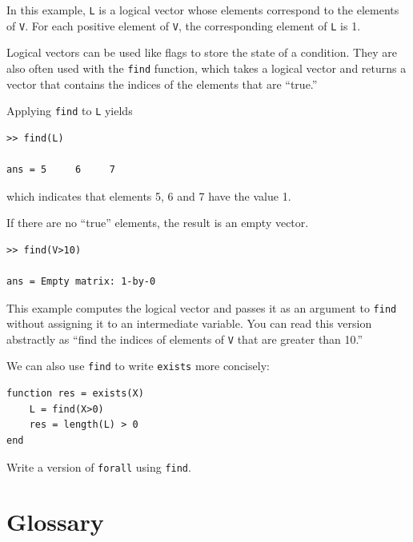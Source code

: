 \documentclass{book}
\begin{document}
In this example, {\tt L} is a logical vector whose elements
correspond to the elements of {\tt V}.  For each positive element of
{\tt V}, the corresponding element of {\tt L} is 1.

Logical vectors can be used like flags to store the state of
a condition.  They are also often used with the {\tt find} function,
which takes a logical vector and returns a vector that contains
the indices of the elements that are ``true.''

Applying {\tt find} to {\tt L} yields

\begin{verbatim}
>> find(L)

ans = 5     6     7
\end{verbatim}

which indicates that elements 5, 6 and 7 have the value 1.

If there are no ``true'' elements, the result is an empty vector.

\begin{verbatim}
>> find(V>10)

ans = Empty matrix: 1-by-0
\end{verbatim}

This example computes the logical vector and passes it as an
argument to {\tt find} without assigning it to an intermediate
variable.  You can read this version abstractly as ``find
the indices of elements of {\tt V} that are greater than 10.''

We can also use {\tt find} to write {\tt exists} more concisely:

\begin{verbatim}
function res = exists(X)
    L = find(X>0)
    res = length(L) > 0
end
\end{verbatim}

\begin{ex}
Write a version of {\tt forall} using {\tt find}.
\end{ex}


\section{Glossary}
\end{document}
